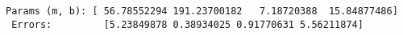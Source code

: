 \documentclass[11pt]{article}
\begin{document}
    \begin{Verbatim}[commandchars=\\\{\}]
Params (m, b): [ 56.78552294 191.23700182   7.18720388  15.84877486] 
 Errors:		 [5.23849878 0.38934025 0.91770631 5.56211874]

    \end{Verbatim}

    \begin{center}
    \end{center}
    { \hspace*{\fill} \\}
    

    
    
    
    
\end{document}
